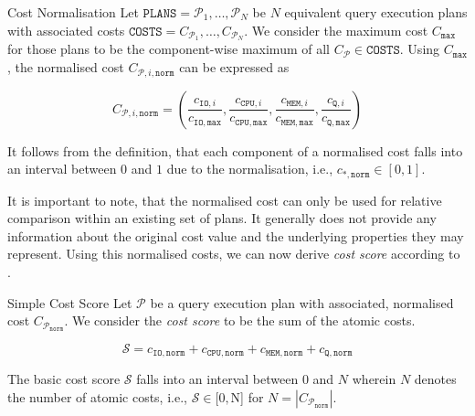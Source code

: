 \begin{definition}[label=definition:cost_normalisation]{Cost Normalisation}{}
    Let $\mathtt{PLANS} = \mathcal{P}_1, \ldots, \mathcal{P}_N$ be $N$ equivalent query execution plans with associated costs $\mathtt{COSTS} =C_{\mathcal{P}_1}, \ldots,C_{\mathcal{P}_N}$. We consider the maximum cost $C_{\mathtt{max}}$ for those plans to be the component-wise maximum of all $C_{\mathcal{P}} \in \mathtt{COSTS}$. Using $C_{\mathtt{max}}$, the normalised cost $ C_{\mathcal{P},i,\mathtt{norm}}$ can be expressed as

    \begin{equation*}
        C_{\mathcal{P},i,\mathtt{norm}} = (\frac{c_{\mathtt{IO},i}}{c_{\mathtt{IO},\mathtt{max}}},\frac{c_{\mathtt{CPU},i}}{c_{\mathtt{CPU},\mathtt{max}}},\frac{c_{\mathtt{MEM},i}}{c_{\mathtt{MEM},\mathtt{max}}},\frac{c_{\mathtt{Q},i}}{c_{\mathtt{Q},\mathtt{max}}})
    \end{equation*}

    It follows from the definition, that each component of a normalised cost falls into an interval between $0$ and $1$ due to the normalisation, i.e., $c_{\mathtt{*},\mathtt{norm}} \in [ 0, 1 ]$.
\end{definition}

It is important to note, that the normalised cost can only be used for relative comparison within an existing set of plans. It generally does not provide any information about the original cost value and the underlying properties they may represent. Using this normalised costs, we can now derive \emph{cost score} according to .

\begin{definition}[label=definition:cost_score]{Simple Cost Score}{}
    Let $\mathcal{P}$  be a query execution plan with associated, normalised cost $C_{\mathcal{P}_{\mathtt{norm}}}$. We consider the \emph{cost score} to be the sum of the atomic costs.

    \begin{equation*}
        \mathcal{S} = c_{\mathtt{IO},\mathtt{norm}} + c_{\mathtt{CPU},\mathtt{norm}} + c_{\mathtt{MEM},\mathtt{norm}} + c_{\mathtt{Q},\mathtt{norm}}
    \end{equation*}

    The basic cost score $ \mathcal{S}$ falls into an interval between $0$ and $N$ wherein $N$ denotes the number of atomic costs, i.e., $\mathcal{S} \in [0, $N] for $N = |C_{\mathcal{P}_{\mathtt{norm}}}|$.
\end{definition}

